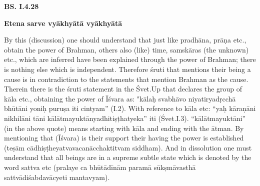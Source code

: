 \smallskip

\textbf{}


\smallskip

\textbf{BS. I.4.28}

\textbf{Etena sarve vyākhyātā vyākhyātā}

By this (discussion) one should understand that just like pradhāna, prāṇa etc., obtain the power of Brahman, others also (like) time,  samskāras (the unknown) etc., which are inferred have been explained through the power of Brahman; there is nothing else which is independent. Therefore śruti that mentions their being a cause is in contradiction to the statements that mention Brahman as the cause. Therein there is the śruti statement in the Śvet.Up that declares the group of kāla etc., obtaining the power of Īśvara as: "kālaḥ svabhāvo niyatiryadṛcchā bhūtāni yoniḥ puruṣa iti cintyam” (I.2).  With reference to kāla etc: “yaḥ kāraṇāni nikhilāni tāni kālātmayuktānyadhitiṣṭhatyeka” iti (Śvet.I.3). “kālātmayuktāni” (in the above quote) means starting with kāla and ending with the ātman. By mentioning that (Īśvara) is their support their having the power is established (teṣām cādhiṣṭheyatvavacanācchaktitvam siddham). And in dissolution one must understand that all beings are in a supreme subtle state which is denoted by the word sattva etc (pralaye ca bhūtādīnām paramā sūkṣmāvasthā sattvādiśabdavācyeti mantavyam).

\eject



